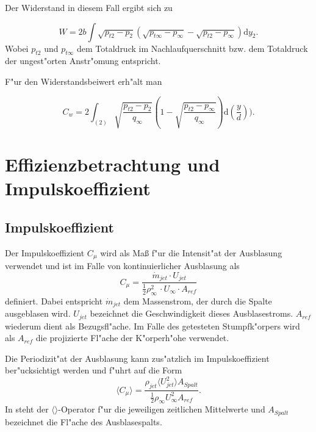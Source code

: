 Der Widerstand in diesem Fall ergibt sich zu

\begin{equation}
	\label{eq:widerstand_korrigiert}
	W = 2b \int \sqrt{p_{t2} - p_2} \left(\sqrt{p_{t\infty} - p_{\infty}} - \sqrt{p_{t2} - p_{\infty}}\right) \mathrm{d} y_2 .
\end{equation}
Wobei $p_{t2}$ und $p_{t\infty}$ dem Totaldruck im Nachlaufquerschnitt bzw. dem Totaldruck der ungest"orten Anstr"omung entspricht.

F"ur den Widerstandsbeiwert erh"alt man

\begin{equation}
	\label{eq:C_w_korrigiert}
	C_w = 2 \int_{(2)} \sqrt{\frac{p_{t2} - p_2}{q_{\infty}}}
	\left(1 - \sqrt{\frac{p_{t2} - p_{\infty}}{q_{\infty}}}\right)  \mathrm{d}\left(\frac{y}{d}\right)).
\end{equation}

\section{Effizienzbetrachtung und Impulskoeffizient}

\subsection{Impulskoeffizient}
Der Impulskoeffizient $C_{\mu}$ wird als Ma\ss{} f"ur die Intensit"at der Ausblasung verwendet \cite{ElSayedM..2018} und ist im Falle von kontinuierlicher Ausblasung als 
\begin{equation}
	\label{eq: Def-momentum-coeff}
	C_{\mu} = \frac{\dot{m}_{jet} \cdot U_{jet}}{\frac{1}{2}\rho^2_{\infty}\, \cdot U_{\infty} \cdot A_{ref}}
\end{equation}
definiert.
Dabei entspricht $\dot{m}_{jet}$ dem Massenstrom, der durch die Spalte ausgeblasen wird. $U_{jet}$ bezeichnet die Geschwindigkeit dieses Ausblasestroms.
$A_{ref}$ wiederum dient als Bezugsfl"ache. Im Falle des getesteten Stumpfk"orpers wird als $A_{ref}$ die projizierte Fl"ache der K"orperh"ohe verwendet. \cite{Bilges.2018}

Die Periodizit"at der Ausblasung kann zus"atzlich im Impulskoeffizient ber"ucksichtigt werden und f"uhrt auf die Form \cite{Chabert.2014}
\begin{equation}
	\label{eq:momentum-coeff-oscill}
	\langle{C_{\mu}}\rangle = \frac{\rho_{jet}\langle{U^2_{jet}}\rangle A_{Spalt}}{\frac{1}{2}\rho_{\infty}U^2_{\infty}A_{ref}}.	
\end{equation}
In  steht der $\langle{}\rangle$-Operator f"ur die jeweiligen zeitlichen Mittelwerte und $A_{Spalt}$ bezeichnet die Fl"ache des Ausblasespalts.

